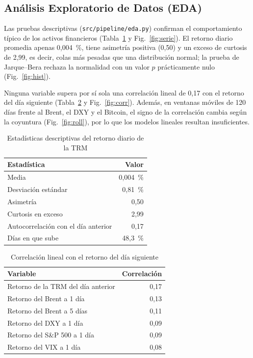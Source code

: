 \documentclass[conference]{IEEEtran}
\begin{document}
\subsection{Análisis Exploratorio de Datos (EDA)}
Las pruebas descriptivas (\texttt{src/pipeline/eda.py}) confirman el comportamiento típico de los activos financieros (Tabla~\ref{tab:desc} y Fig.~\ref{fig:serie}). El retorno diario promedia apenas 0,004~\%, tiene asimetría positiva (0,50) y un exceso de curtosis de 2,99, es decir, colas más pesadas que una distribución normal; la prueba de Jarque--Bera rechaza la normalidad con un valor $p$ prácticamente nulo (Fig.~\ref{fig:hist}).

Ninguna variable supera por sí sola una correlación lineal de 0,17 con el retorno del día siguiente (Tabla~\ref{tab:corr} y Fig.~\ref{fig:corr}). Además, en ventanas móviles de 120 días frente al Brent, el DXY y el Bitcoin, el signo de la correlación cambia según la coyuntura (Fig.~\ref{fig:roll}), por lo que los modelos lineales resultan insuficientes.

\begin{table}[t]
\caption{Estadísticas descriptivas del retorno diario de la TRM}
\label{tab:desc}
\centering
\footnotesize
\begin{tabular}{@{}lr@{}}
\toprule
Estadística & Valor \\
\midrule
Media & 0,004~\% \\
Desviación estándar & 0,81~\% \\
Asimetría & 0,50 \\
Curtosis en exceso & 2,99 \\
Autocorrelación con el día anterior & 0,17 \\
Días en que sube & 48,3~\% \\
\bottomrule
\end{tabular}
\end{table}

\begin{table}[t]
\caption{Correlación lineal con el retorno del día siguiente}
\label{tab:corr}
\centering
\footnotesize
\begin{tabular}{@{}lr@{}}
\toprule
Variable & Correlación \\
\midrule
Retorno de la TRM del día anterior & 0,17 \\
Retorno del Brent a 1 día & 0,13 \\
Retorno del Brent a 5 días & 0,11 \\
Retorno del DXY a 1 día & 0,09 \\
Retorno del S\&P 500 a 1 día & 0,09 \\
Retorno del VIX a 1 día & 0,08 \\
\bottomrule
\end{tabular}
\end{table}
\end{document}
